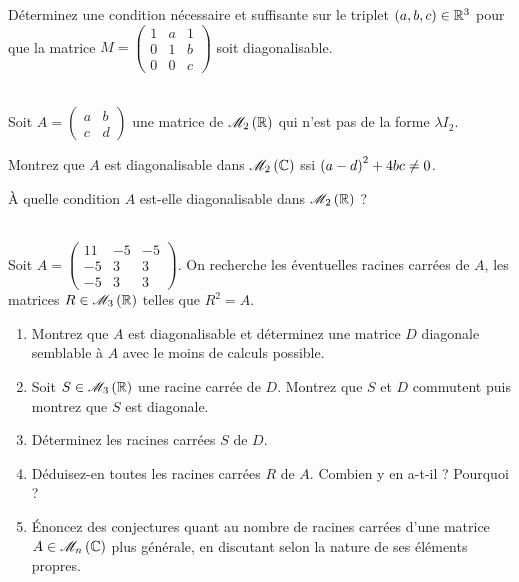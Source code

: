 \begin{corr}
\end{corr}

\begin{exos}[Exercice 12]
Déterminez une condition nécessaire et suffisante sur le triplet \(\left(a,b,c\right)\in\mathbb{R}^3\) pour que la matrice \(M=\begin{pmatrix}
1 & a & 1 \\
0 & 1 & b \\
0 & 0 & c
\end{pmatrix}\) soit diagonalisable.
\end{exos}

\begin{corr}
\end{corr}

\begin{exos}[Exercice 13]~\\
Soit \(A=\begin{pmatrix}
a & b \\
c & d
\end{pmatrix}\) une matrice de \(\M{2}[\R]\) qui n'est pas de la forme \(\lambda I_2\).

Montrez que \(A\) est diagonalisable dans \(\M{2}[\C]\) ssi \(\left(a-d\right)^2+4bc\not=0\).

À quelle condition \(A\) est-elle diagonalisable dans \(\M{2}[\R]\) ?
\end{exos}

\begin{corr}
\end{corr}

\begin{exoss}[Exercice 14]~\\
Soit \(A=\begin{pmatrix}
11 & -5 & -5 \\
-5 & 3 & 3 \\
-5 & 3 & 3
\end{pmatrix}\). On recherche les éventuelles racines carrées de \(A\), \cad les matrices \(R\in\M{3}[\R]\) telles que \(R^2=A\).

\begin{enumerate}
    \item Montrez que \(A\) est diagonalisable et déterminez une matrice \(D\) diagonale semblable à \(A\) avec le moins de calculs possible. \\
    \item Soit \(S\in\M{3}[\R]\) une racine carrée de \(D\). Montrez que \(S\) et \(D\) commutent puis montrez que \(S\) est diagonale. \\
    \item Déterminez les racines carrées \(S\) de \(D\). \\
    \item Déduisez-en toutes les racines carrées \(R\) de \(A\). Combien y en a-t-il ? Pourquoi ? \\
    \item Énoncez des conjectures quant au nombre de racines carrées d'une matrice \(A\in\M{n}[\C]\) plus générale, en discutant selon la nature de ses éléments propres.
\end{enumerate}
\end{exoss}

